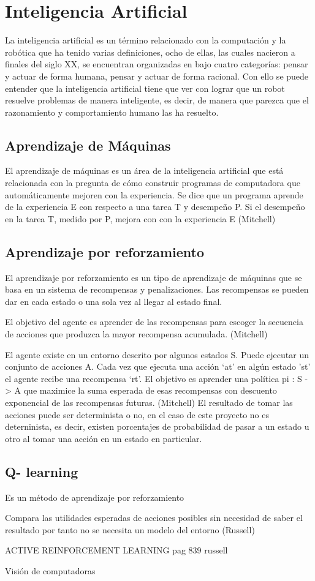 \section{Inteligencia Artificial} \label{sect:Inteligencia_Artificial}
La inteligencia artificial es un término relacionado con la computación y la robótica que ha tenido varias definiciones, ocho de ellas, las cuales nacieron a finales del siglo XX, se encuentran organizadas en \cite{peterNorvig} bajo cuatro categorías: pensar y actuar de forma humana, pensar y actuar de forma racional. Con ello se puede entender que la inteligencia artificial tiene que ver con lograr que un robot resuelve problemas de manera inteligente, es decir, de manera que parezca que el razonamiento y comportamiento humano las ha resuelto.  

\subsection{ Aprendizaje de Máquinas}
El aprendizaje de máquinas es un área de la inteligencia artificial que está relacionada con la pregunta de cómo construir programas de computadora que automáticamente mejoren con la experiencia. Se dice que un programa aprende de la experiencia E con respecto a una tarea T y desempeño P. Si el desempeño en la tarea T, medido por P, mejora con con la experiencia E (Mitchell) 

\subsection{Aprendizaje por reforzamiento}
El aprendizaje por reforzamiento es un tipo de aprendizaje de máquinas que se basa en un sistema de recompensas y penalizaciones. Las recompensas se pueden dar en cada estado o una sola vez al llegar al estado final.

El objetivo del agente es aprender de las recompensas para escoger la secuencia de acciones que produzca la mayor recompensa acumulada. (Mitchell) 

El agente existe en un entorno descrito por algunos estados S. Puede ejecutar un conjunto de acciones A. Cada vez que ejecuta una acción ‘at’ en algún estado 'st' el agente recibe una recompensa ‘rt’. El objetivo es aprender una política pi : S -> A que maximice la suma esperada de esas recompensas con descuento exponencial de las recompensas futuras. (Mitchell) El resultado de tomar las acciones puede ser determinista o no, en el caso de este proyecto no es deterninista, es decir, existen porcentajes de probabilidad de pasar a un estado u otro al tomar una acción en un estado en particular.  

\subsection{ Q- learning}

Es un método de aprendizaje por reforzamiento

Compara las utilidades esperadas de acciones posibles sin necesidad de saber el resultado por tanto no se necesita un modelo del entorno (Russell) 

ACTIVE REINFORCEMENT LEARNING pag 839 russell 

Visión de computadoras

